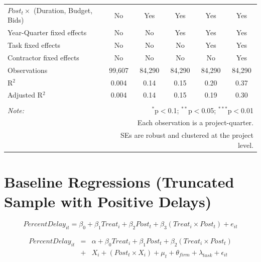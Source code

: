 \documentclass[
]{article}
\begin{document}
\begin{table}[H]
\begin{tabular}{@{\extracolsep{-2pt}}lccccc}
$Post_t \times$  (Duration, Budget, Bids) & No & Yes & Yes & Yes & Yes \\ 
Year-Quarter fixed effects & No & No & Yes & Yes & Yes \\ 
Task fixed effects & No & No & No & Yes & Yes \\ 
Contractor fixed effects & No & No & No & No & Yes \\ 
Observations & 99,607 & 84,290 & 84,290 & 84,290 & 84,290 \\ 
R$^{2}$ & 0.004 & 0.14 & 0.15 & 0.20 & 0.37 \\ 
Adjusted R$^{2}$ & 0.004 & 0.14 & 0.15 & 0.19 & 0.30 \\ 
\hline 
\hline \\[-1.8ex] 
\textit{Note:}  & \multicolumn{5}{r}{$^{*}$p$<$0.1; $^{**}$p$<$0.05; $^{***}$p$<$0.01} \\ 
 & \multicolumn{5}{r}{Each observation is a project-quarter.} \\ 
 & \multicolumn{5}{r}{SEs are robust and clustered at the project level.} \\ 
\end{tabular} 
\end{table}

\hypertarget{baseline-regressions-truncated-sample-with-positive-delays}{%
\section{Baseline Regressions (Truncated Sample with Positive
Delays)}\label{baseline-regressions-truncated-sample-with-positive-delays}}

\[ PercentDelay_{it} = \beta_0 + \beta_1 Treat_i + \beta_2 Post_t + \beta_3 (Treat_i \times Post_t) + e_{it}\]

\[ \begin{aligned} PercentDelay_{it} &=& \alpha+\beta_0 Treat_i + \beta_1 Post_t + \beta_2 (Treat_i \times Post_t)\\
&+&  X_i + (Post_t \times X_i) + \mu_t + \theta_{firm} + \lambda_{task}+ \epsilon_{it}
\end{aligned}\]
\end{document}
